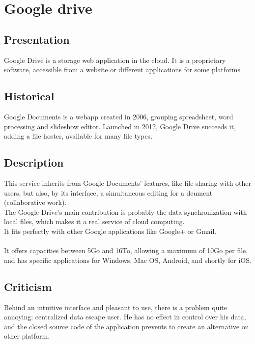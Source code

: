 \section{Google drive}
\thispagestyle{EIP} %

\subsection{Presentation}
Google Drive is a storage web application in the cloud. It is a proprietary software, accessible from a website or different applications for some platforms

\subsection{Historical}
Google Documents is a webapp created in 2006, grouping spreadsheet, word processing and slideshow editor.
Launched in 2012, Google Drive succeeds it, adding a file hoster, available for many file types.\\

\subsection{Description}
This service inherits from Google Documents' features, like file sharing with other users, but also, by its interface, a simultaneous editing for a dcument (collaborative work).\\
The Google Drive's main contribution is probably the data synchronization with local files, which makes it a real service of cloud computing.\\
It fits perfectly with other Google applications like Google+ or Gmail.\\
\\
It offers capacities between 5Go and 16To, allowing a maximum of 10Go per file, and has specific applications for Windows, Mac OS, Android, and shortly for iOS.\\

\subsection{Criticism}
Behind an intuitive interface and pleasant to use, there is a problem quite annoying: centralized data escape user. He has no effect in control over his data, and the closed source code of the application prevents to create an alternative on other platform.